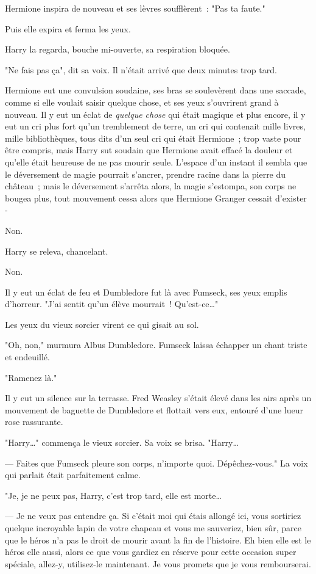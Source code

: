 Hermione inspira de nouveau et ses lèvres soufflèrent~: "Pas ta faute."

Puis elle expira et ferma les yeux.

Harry la regarda, bouche mi-ouverte, sa respiration bloquée.

"Ne fais pas ça", dit sa voix. Il n'était arrivé que deux minutes trop tard.

Hermione eut une convulsion soudaine, ses bras se soulevèrent dans une saccade, comme si elle voulait saisir quelque chose, et ses yeux s'ouvrirent grand à nouveau. Il y eut un éclat de \emph{quelque chose} qui était magique et plus encore, il y eut un cri plus fort qu'un tremblement de terre, un cri qui contenait mille livres, mille bibliothèques, tous dits d'un seul cri qui était Hermione~; trop vaste pour être compris, mais Harry sut soudain que Hermione avait effacé la douleur et qu'elle était heureuse de ne pas mourir seule. L'espace d'un instant il sembla que le déversement de magie pourrait s'ancrer, prendre racine dans la pierre du château~; mais le déversement s'arrêta alors, la magie s'estompa, son corps ne bougea plus, tout mouvement cessa alors que Hermione Granger cessait d'exister -

Non.

Harry se releva, chancelant.

Non.

Il y eut un éclat de feu et Dumbledore fut là avec Fumseck, ses yeux emplis d'horreur. "J'ai sentit qu'un élève mourrait~! Qu'est-ce…"

Les yeux du vieux sorcier virent ce qui gisait au sol.

"Oh, non," murmura Albus Dumbledore. Fumseck laissa échapper un chant triste et endeuillé.

"Ramenez là."

Il y eut un silence sur la terrasse. Fred Weasley s'était élevé dans les airs après un mouvement de baguette de Dumbledore et flottait vers eux, entouré d'une lueur rose rassurante.

"Harry…" commença le vieux sorcier. Sa voix se brisa. "Harry…

--- Faites que Fumseck pleure son corps, n'importe quoi. Dépêchez-vous." La voix qui parlait était parfaitement calme.

"Je, je ne peux pas, Harry, c'est trop tard, elle est morte…

--- Je ne veux pas entendre ça. Si c'était moi qui étais allongé ici, vous sortiriez quelque incroyable lapin de votre chapeau et vous me sauveriez, bien sûr, parce que le héros n'a pas le droit de mourir avant la fin de l'histoire. Eh bien elle est le héros elle aussi, alors ce que vous gardiez en réserve pour cette occasion super spéciale, allez-y, utilisez-le maintenant. Je vous promets que je vous rembourserai.

